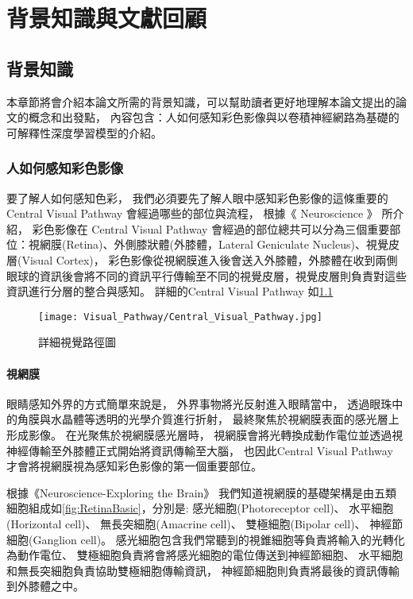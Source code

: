\documentclass[class=NCU_thesis, crop=false]{standalone}
\begin{document}
\chapter{背景知識與文獻回顧}
\section{背景知識}

本章節將會介紹本論文所需的背景知識，可以幫助讀者更好地理解本論文提出的論文的概念和出發點，
內容包含：人如何感知彩色影像與以卷積神經網路為基礎的可解釋性深度學習模型的介紹。

\subsection{人如何感知彩色影像}

要了解人如何感知色彩，
我們必須要先了解人眼中感知彩色影像的這條重要的 Central Visual Pathway 會經過哪些的部位與流程，
根據《 Neuroscience 》 \cite{Purves2004Neuroscience3E}所介紹，
彩色影像在 Central Visual Pathway 會經過的部位總共可以分為三個重要部位：視網膜(Retina)、外側膝狀體(外膝體，Lateral Geniculate Nucleus)、視覺皮層(Visual Cortex)，
彩色影像從視網膜進入後會送入外膝體，外膝體在收到兩側眼球的資訊後會將不同的資訊平行傳輸至不同的視覺皮層，視覺皮層則負責對這些資訊進行分層的整合與感知。
詳細的Central Visual Pathway 如\cref{fig:Central_Visual_Pathway}

\begin{figure}[H]
  \centering
  \texttt{[image: Visual\_Pathway/Central\_Visual\_Pathway.jpg]}
  \caption{詳細視覺路徑圖~\cite{Purves2004Neuroscience3E}}
  \label{fig:Central_Visual_Pathway}
\end{figure}

\subsubsection{視網膜}

眼睛感知外界的方式簡單來說是，
外界事物將光反射進入眼睛當中，
透過眼珠中的角膜與水晶體等透明的光學介質進行折射，
最終聚焦於視網膜表面的感光層上形成影像。
在光聚焦於視網膜感光層時，
視網膜會將光轉換成動作電位並透過視神經傳輸至外膝體正式開始將資訊傳輸至大腦，
也因此Central Visual Pathway 才會將視網膜視為感知彩色影像的第一個重要部位。

根據《Neuroscience-Exploring the Brain》\cite{bear2016neuroscience}
我們知道視網膜的基礎架構是由五類細胞組成如\cref{fig:RetinaBasic}，分別是: 感光細胞(Photoreceptor cell)、 水平細胞(Horizontal cell)、 無長突細胞(Amacrine cell)、 雙極細胞(Bipolar cell)、 神經節細胞(Ganglion cell)。 感光細胞包含我們常聽到的視錐細胞等負責將輸入的光轉化為動作電位、 
雙極細胞負責將會將感光細胞的電位傳送到神經節細胞、
水平細胞和無長突細胞負責協助雙極細胞傳輸資訊，
神經節細胞則負責將最後的資訊傳輸到外膝體之中。
\end{document}
